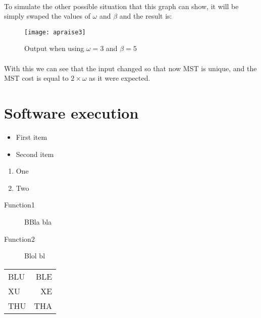 \documentclass[titlepage]{article}
\begin{document}
    \paragraph{}
    To simulate the other possible situation that this graph can show, it will be simply swaped the values of $\omega$ and $\beta$ and the result is:
    \begin{figure}[h]
        \begin{center}
            \texttt{[image: apraise3]}
            \caption{Output when using $\omega=3$ and $\beta=5$}
        \end{center}
    \end{figure}
    \paragraph{}
    With this we can see that the input changed so that now MST is unique, and the MST cost is equal to $2\times\omega$ as it were expected.
    \section{Software execution}
    
    \begin{itemize}
        \item First item
        \item Second item
    \end{itemize}

    \begin{enumerate}
        \item One
        \item Two
    \end{enumerate}

    \begin{description}
        \item[Function1] BBla bla
        \item[Function2] Blol bl 
    \end{description}
    
    \begin{tabular}{lr}
        BLU & BLE\\
        XU & XE\\
        THU & THA\\
    \end{tabular}
\end{document}
